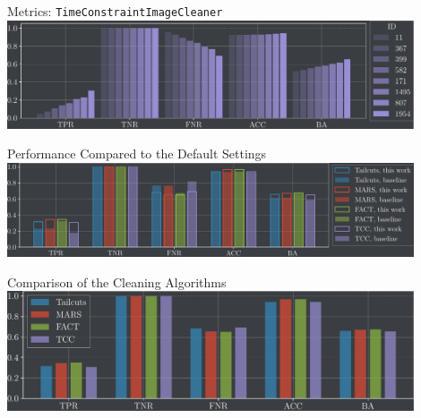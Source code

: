 \begin{frame}{Metrics: \texttt{TimeConstraintImageCleaner}}
    \vspace{-0.1cm}
    \centering
    \includegraphics[width=0.9\textwidth]{build/metrics_tcc.pdf}
\end{frame}

\begin{frame}{Performance Compared to the Default Settings}
    \centering
    \includegraphics[width=0.9\textwidth]{build/metrics_baseline.pdf}
\end{frame}

\begin{frame}{Comparison of the Cleaning Algorithms}
    \centering
    \includegraphics[width=0.9\textwidth]{build/metrics_all.pdf}
\end{frame}